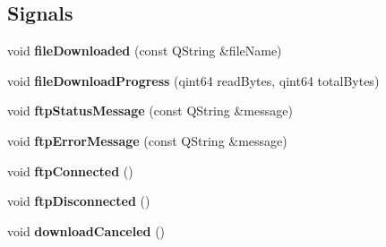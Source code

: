 \subsection*{Signals}
\begin{DoxyCompactItemize}
\item 
\hypertarget{class_log__viewer_1_1ftp__files__model_a2d9ff3e9fa30a615e48a3bf4815c69b8}{void {\bfseries file\-Downloaded} (const Q\-String \&file\-Name)}\label{class_log__viewer_1_1ftp__files__model_a2d9ff3e9fa30a615e48a3bf4815c69b8}

\item 
\hypertarget{class_log__viewer_1_1ftp__files__model_ad2f6d4807002405e2fffa8d1c0df0b65}{void {\bfseries file\-Download\-Progress} (qint64 read\-Bytes, qint64 total\-Bytes)}\label{class_log__viewer_1_1ftp__files__model_ad2f6d4807002405e2fffa8d1c0df0b65}

\item 
\hypertarget{class_log__viewer_1_1ftp__files__model_a6bec2dccd8e64543972f5cb06aee8cc9}{void {\bfseries ftp\-Status\-Message} (const Q\-String \&message)}\label{class_log__viewer_1_1ftp__files__model_a6bec2dccd8e64543972f5cb06aee8cc9}

\item 
\hypertarget{class_log__viewer_1_1ftp__files__model_a305a775640096aed359d0779d00fc6c7}{void {\bfseries ftp\-Error\-Message} (const Q\-String \&message)}\label{class_log__viewer_1_1ftp__files__model_a305a775640096aed359d0779d00fc6c7}

\item 
\hypertarget{class_log__viewer_1_1ftp__files__model_aa2f7d50cab8d77944ab0810534694f57}{void {\bfseries ftp\-Connected} ()}\label{class_log__viewer_1_1ftp__files__model_aa2f7d50cab8d77944ab0810534694f57}

\item 
\hypertarget{class_log__viewer_1_1ftp__files__model_a11f002e9299bd7041f04b4436bcc3881}{void {\bfseries ftp\-Disconnected} ()}\label{class_log__viewer_1_1ftp__files__model_a11f002e9299bd7041f04b4436bcc3881}

\item 
\hypertarget{class_log__viewer_1_1ftp__files__model_a43a577bf496daf71ba7ddf8cf1547033}{void {\bfseries download\-Canceled} ()}\label{class_log__viewer_1_1ftp__files__model_a43a577bf496daf71ba7ddf8cf1547033}

\end{DoxyCompactItemize}
